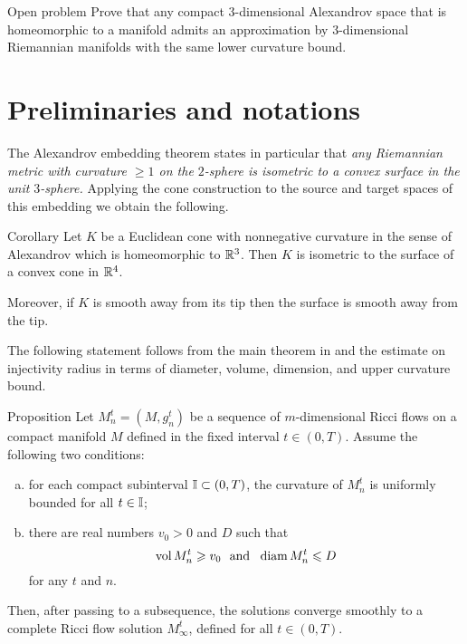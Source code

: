 \documentclass[a4paper,10pt]{amsart}
\begin{document}
\begin{thm}{Open problem}
Prove that any compact $3$-dimensional Alexandrov space that is homeomorphic to a manifold admits an approximation by $3$-dimensional Riemannian manifolds with the same lower curvature bound.
\end{thm}



\section{Preliminaries and notations}



The Alexandrov embedding theorem states in particular that 
\textit{any Riemannian metric with curvature $\ge 1$ on the $2$-sphere
is isometric to a convex surface in the unit $3$-sphere.}
Applying the cone construction 
to the source 
and target spaces 
of this embedding we obtain the following.

\begin{thm}{Corollary}\label{cor:alex}
Let $K$ be a Euclidean cone with nonnegative curvature in the sense of Alexandrov which is homeomorphic to $\mathbb{R}^3$.
Then $K$ is isometric to the surface of a convex cone in $\mathbb{R}^4$.

Moreover, if $K$ is smooth away from its tip 
then the surface is smooth away from the tip.
\end{thm}

The following statement follows from the main theorem in \cite{hamilton-compactness} and 
the estimate on injectivity radius in terms of diameter, volume, dimension, and upper curvature bound.

\begin{thm}{Proposition}\label{prop:ricc-convergence}
Let $M_n^t=(M,g_n^t)$ be a sequence of $m$-dimensional Ricci flows on a compact manifold $M$
defined in the fixed interval $t\in(0,T)$. 
Assume the following two conditions:
\begin{enumerate}[(a)]
\item for each compact subinterval $\mathbb{I} \subset (0,T)$, 
the curvature of $M_n^t$ is uniformly bounded for all $t\in \mathbb{I}$;
\item there are real numbers $v_0>0$ and $D$ such that 
\[\vol M_n^t\ge v_0\ \ \text{and}\ \ \diam M_n^t\le D\] 
for any $t$ and $n$.
\end{enumerate}
Then, after passing to a subsequence, the solutions converge smoothly to a complete Ricci flow solution $M_\infty^t$, defined for all $t\in (0,T)$.
\end{thm}
\end{document}
